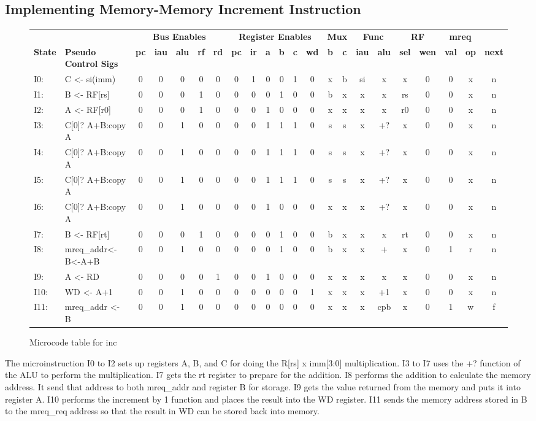 \documentclass[10pt]{article}
\begin{document}
\subsection{Implementing Memory-Memory Increment Instruction}
\begin{figure}[H]
\centering
{\setlength{\tabcolsep}{2pt}
\begin{tabular}{@{\extracolsep{3pt}}llcccccccccccccccccccc@{}}
\hline
& & \multicolumn{5}{c}{\textbf{Bus Enables}}
& \multicolumn{6}{c}{\textbf{Register Enables}}
& \multicolumn{2}{c}{\textbf{Mux}}
& \multicolumn{2}{c}{\textbf{Func}}
& \multicolumn{2}{c}{\textbf{RF}}
& \multicolumn{2}{c}{\textbf{mreq}}\\
\cline{3-7} 
\cline{8-13}
\cline{14-15}
\cline{16-17}
\cline{18-19}
\cline{20-21} 
\textbf{State} & \textbf{Pseudo Control Sigs} & \textbf{pc} & \textbf{iau} & \textbf{alu} & \textbf{rf} & \textbf{rd} & \textbf{pc} & \textbf{ir} & \textbf{a} & \textbf{b} & \textbf{c} & \textbf{wd} & \textbf{b} & \textbf{c} & \textbf{iau} & \textbf{alu} & \textbf{sel} & \textbf{wen} & \textbf{val} & \textbf{op} & \textbf{next} \\
\hline
I0: & C <- si(imm) &0&0&0&0&0&0&1&0&0&1&0&x&b&si&x&x&0&0&x&n \\
\hline
I1: & B <- RF[rs] &0&0&0&1&0&0&0&0&1&0&0&b&x&x&x&rs&0&0&x&n\\
\hline
I2: & A <- RF[r0] &0&0&0&1&0&0&0&1&0&0&0&x&x&x&x&r0&0&0&x&n\\
\hline
I3: & C[0]? A+B:copy A &0&0&1&0&0&0&0&1&1&1&0&s&s&x&+?&x&0&0&x&n\\
\hline
I4: & C[0]? A+B:copy A &0&0&1&0&0&0&0&1&1&1&0&s&s&x&+?&x&0&0&x&n\\
\hline
I5: & C[0]? A+B:copy A &0&0&1&0&0&0&0&1&1&1&0&s&s&x&+?&x&0&0&x&n\\
\hline
I6: & C[0]? A+B:copy A &0&0&1&0&0&0&0&1&0&0&0&x&x&x&+?&x&0&0&x&n\\
\hline
I7: & B <- RF[rt] &0&0&0&1&0&0&0&0&1&0&0&b&x&x&x&rt&0&0&x&n\\
\hline
I8: & mreq\_addr<-B<-A+B &0&0&1&0&0&0&0&0&1&0&0&b&x&x&+&x&0&1&r&n\\
\hline
I9: & A <- RD &0&0&0&0&1&0&0&1&0&0&0&x&x&x&x&x&0&0&x&n\\
\hline
I10: & WD <- A+1 &0&0&1&0&0&0&0&0&0&0&1&x&x&x&+1&x&0&0&x&n\\
\hline
I11: & mreq\_addr <- B &0&0&1&0&0&0&0&0&0&0&0&x&x&x&cpb&x&0&1&w&f\\
\hline
\end{tabular}
}
\caption{Microcode table for inc}
\label{fig:mem_mem_incr}
\end{figure}
The microinstruction I0 to I2 sets up registers A, B, and C for doing the R[rs] x imm[3:0] multiplication. I3 to I7 uses the +? function of the ALU to perform the multiplication. I7 gets the rt register to prepare for the addition. I8 performs the addition to calculate the memory address. It send that address to both mreq\_addr and register B for storage. I9 gets the value returned from the memory and puts it into register A. I10 performs the increment by 1 function and places the result into the WD register. I11 sends the memory address stored in B to the mreq\_req address so that the result in WD can be stored back into memory.
\end{document}
